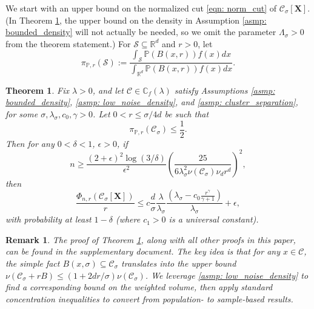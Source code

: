 \documentclass{article}
\newcommand{\Reals}{\mathbb{R}}
\newcommand{\Rd}{\Reals^d}
\newcommand{\1}{\mathbf{1}}
\newcommand{\Xbf}{\mathbf{X}}
\newcommand{\Pbb}{\mathbb{P}}
\newcommand{\Cbb}{\mathbb{C}}
\newcommand{\Cset}{\mathcal{C}}
\newcommand{\Csig}{\Cset_{\sigma}}
\theoremstyle{aldenthm}
\newtheorem{theorem}{Theorem}
\theoremstyle{aldenrmrk}
\newtheorem{remark}{Remark}
\begin{document}
We start with an upper bound on the normalized cut \eqref{eqn: norm_cut} of 
$\Cset_\sigma[\Xbf]$. (In Theorem \ref{thm: conductance_upper_bound}, the upper bound on the density in
Assumption \ref{asmp: bounded_density} will not actually be needed, so we omit
the parameter $\Lambda_\sigma>0$ from the theorem statement.) For $\mathcal{S} \subseteq \Reals^d$ and $r > 0$, let
\begin{equation*}
\pi_{\Pbb,r}(\mathcal{S}) := \frac{\int_{\mathcal{S}} \Pbb(B(x,r)) f(x) dx }{\int_{\Rd} \Pbb(B(x,r)) f(x) dx}.
\end{equation*}

\begin{theorem}
\label{thm: conductance_upper_bound}
Fix $\lambda > 0$, and let $\Cset \in \Cbb_f(\lambda)$ satisfy
Assumptions \ref{asmp: bounded_density}, \ref{asmp: low_noise_density},
and \ref{asmp: cluster_separation}, for some 
$\sigma, \lambda_{\sigma}, c_0, \gamma > 0$. Let $0 < r \leq \sigma/4d$ be such that
\begin{equation}
\label{eqn: weighted_cluster_volume}
\pi_{\Pbb,r}(\Csig) \leq \frac{1}{2}.
\end{equation}
 Then for any $0 < \delta < 1$, $\epsilon > 0$, if
\begin{equation}
\label{eqn: conductance_sample_complexity}
n \geq \frac{(2+\epsilon)^2\log(3/\delta)}{\epsilon^2}\left(\frac{25}
  {6 \lambda_{\sigma}^2\nu(\Csig) \nu_d r^d}\right)^2,
\end{equation}
then
\begin{equation}
  \label{eqn: conductance_additive_error_bound}
  \frac{\Phi_{n,r}(\Csig[\mathbf{X}])}{r} \leq c \frac{d}{\sigma}
  \frac{\lambda}{\lambda_{\sigma}} \frac{(\lambda_{\sigma} -
    c_0\frac{r^{\gamma}}{\gamma+1})}{\lambda_{\sigma}} + \epsilon, 
\end{equation}
with probability at least $1-\delta$ (where $c_1 > 0$ is a universal constant).
\end{theorem}

\begin{remark}
The proof of Theorem \ref{thm: conductance_upper_bound}, along with all other
proofs in this paper, can be found in the supplementary document. The key 
idea is that for any $x \in \Cset$, the simple fact
$B(x,\sigma) \subseteq \Csig$ translates into the upper bound $\nu(\Csig + rB) \leq (1 + 2d r /\sigma)\nu(\Csig)$. We leverage \ref{asmp:
  low_noise_density} to find a corresponding bound on the weighted volume,
then apply standard concentration inequalities to convert from population-
to sample-based results.  
\end{remark}
\end{document}
